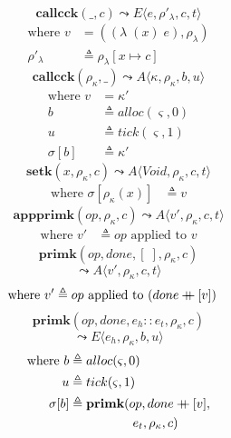 \documentclass[12pt,draft]{article}
\newcommand\mdoubleplus{\ensuremath{\mathbin{+\mkern-9mu+}}}
\newcommand{\singlelamsyn}[2]{(\lambda\;(#1)\;#2)}
\begin{document}
\begin{multicols*}{2}
\[
\textbf{callcck}(\_, c)
\leadsto
E\langle
e , \rho'_{\lambda} , c , t
\rangle
\]
\vspace{-13mm}
\begin{align*}
\text{where } v &= (\singlelamsyn{x}{e} , \rho_{\lambda}) \\
\rho'_{\lambda} &\triangleq \rho_{\lambda}[x \mapsto c]
\end{align*}
\[
\textbf{callcck}(\rho_\kappa , \_)
\leadsto
A\langle
\kappa , \rho_\kappa , b , u
\rangle
\]
\vspace{-10mm}
\begin{align*}
\text{where } v &= \kappa' \\
b &\triangleq alloc(\varsigma, 0) \\
u &\triangleq tick(\varsigma, 1) \\
\sigma[b] &\triangleq \kappa'
\end{align*}
\[
\textbf{setk}(x, \rho_{\kappa}, c)
\leadsto
A\langle
\textit{Void} , \rho_{\kappa} , c , t
\rangle
\]
\vspace{-10mm}
\begin{align*}
\text{where } \sigma[\rho_{\kappa}(x)] &\triangleq v
\end{align*}
\[
\textbf{appprimk}(op, \rho_{\kappa}, c)
\leadsto
A\langle
v' , \rho_{\kappa} , c , t
\rangle
\]
\vspace{-10mm}
\begin{align*}
\text{where } v' &\triangleq op \text{ applied to } v
\end{align*}
\[
\textbf{primk}(op, done, [\;], \rho_{\kappa}, c)
\]
\vspace{-7mm}
\[
\leadsto
A\langle
v' , \rho_{\kappa} , c , t
\rangle
\]
\vspace{-10mm}
\begin{align*}
\text{where } v' &\triangleq op \text{ applied to } (done \mdoubleplus [v])
\end{align*}
\[
\textbf{primk}(op, done, e_h::e_t,\rho_{\kappa}, c)
\]
\vspace{-7mm}
\[
\leadsto
E\langle
e_h , \rho_{\kappa} , b , u
\rangle
\]
\vspace{-11mm}
\begin{align*}
\text{where } b &\triangleq alloc(\varsigma, 0) \\
u &\triangleq tick(\varsigma, 1) \\
\sigma[b] &\triangleq \textbf{primk}(op, done \mdoubleplus [v], \\
&\;\;\;\;\;\;\;\;\;\;\;\;\;\;\;\;\;\; e_t, \rho_{\kappa}, c)
\end{align*}
\end{multicols*}
\newpage
\end{document}
